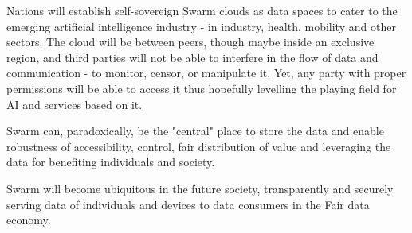Nations will establish self-sovereign Swarm clouds as data spaces to cater to the emerging artificial intelligence industry - in industry, health, mobility and other sectors. The cloud will be between peers, though maybe inside an exclusive region, and third parties will not be able to interfere in the flow of data and communication - to monitor, censor,  or manipulate it. Yet, any party with proper permissions will be able to access it thus hopefully levelling the playing field for AI and services based on it.  

Swarm can, paradoxically, be the "central" place to store the data and enable robustness of accessibility, control, fair distribution of value and leveraging the data for benefiting individuals and society.

Swarm will become ubiquitous in the future society, transparently and securely serving data of individuals and devices to data consumers in the Fair data economy.

